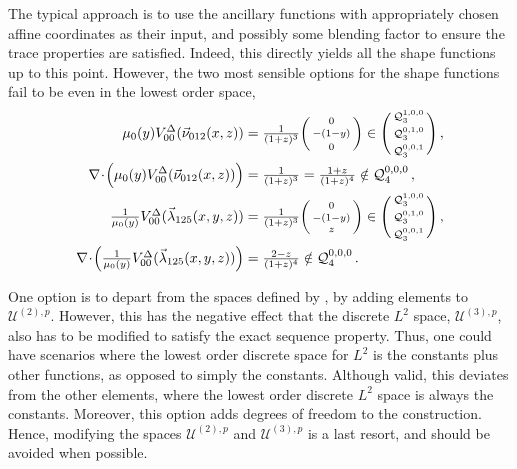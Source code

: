 The typical approach is to use the ancillary functions with appropriately chosen affine coordinates as their input, and possibly some blending factor to ensure the trace properties are satisfied.
Indeed, this directly yields all the shape functions up to this point.
However, the two most sensible options for the shape functions fail to be even in the lowest order space,
\begin{equation}
\begin{aligned}
	\mu_0(y)V_{00}^\Delta(\vec{\nu}_{012}(x,z))
		&=\textstyle{\frac{1}{(1+z)^3}}\bigg(\begin{smallmatrix}0\\[2pt]-(1-y)\\[2pt]0\end{smallmatrix}\bigg)
			\in\Bigg(\begin{smallmatrix}\mathcal{Q}_{3}^{1,0,0}\\[2pt]\mathcal{Q}_{3}^{0,1,0}\\[2pt]
				\mathcal{Q}_{3}^{0,0,1}\end{smallmatrix}\Bigg)\,,\\
	\nabla\!\cdot\!\Big(\mu_0(y)V_{00}^\Delta(\vec{\nu}_{012}(x,z))\Big)
		&=\textstyle{\frac{1}{(1+z)^3}}=\textstyle{\frac{1+z}{(1+z)^4}}\notin\mathcal{Q}_{4}^{0,0,0}\,,\\
	\textstyle{\frac{1}{\mu_0(y)}}V_{00}^\Delta(\vec{\lambda}_{125}(x,y,z))
		&=\textstyle{\frac{1}{(1+z)^3}}\bigg(\begin{smallmatrix}0\\[2pt]-(1-y)\\[2pt]z\end{smallmatrix}\bigg)
			\in\Bigg(\begin{smallmatrix}\mathcal{Q}_{3}^{1,0,0}\\[2pt]\mathcal{Q}_{3}^{0,1,0}\\[2pt]
				\mathcal{Q}_{3}^{0,0,1}\end{smallmatrix}\Bigg)\,,\\
	\nabla\!\cdot\!\Big(\textstyle{\frac{1}{\mu_0(y)}}V_{00}^\Delta(\vec{\lambda}_{125}(x,y,z))\Big)
		&=\textstyle{\frac{2-z}{(1+z)^4}}\notin\mathcal{Q}_{4}^{0,0,0}\,.		
\end{aligned}
\label{eq:PyrFailedAttempts}
\end{equation}

One option is to depart from the spaces defined by \citet{Nigam_Phillips_11}, by adding elements to $\mathcal{U}^{(2),p}$.
However, this has the negative effect that the discrete $L^2$ space, $\mathcal{U}^{(3),p}$, also has to be modified to satisfy the exact sequence property.
Thus, one could have scenarios where the lowest order discrete space for $L^2$ is the constants plus other functions, as opposed to simply the constants.
Although valid, this deviates from the other elements, where the lowest order discrete $L^2$ space is always the constants.
Moreover, this option adds degrees of freedom to the construction.
Hence, modifying the spaces $\mathcal{U}^{(2),p}$ and $\mathcal{U}^{(3),p}$ is a last resort, and should be avoided when possible.

